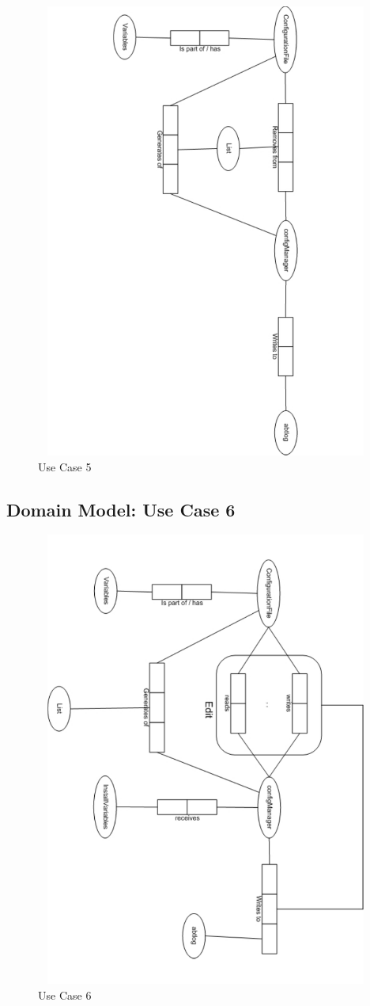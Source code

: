 \begin{figure}[htbp]
  \centering
  \includegraphics[angle=90,width=15cm,height=15cm]{"domainmodel-usecase5"}
  \caption{Use Case 5}
  \label{fig:usecase5}
\end{figure}

\newpage
\subsection{Domain Model: Use Case 6}

\begin{figure}[htbp]
  \centering
  \includegraphics[angle=90,width=15cm,height=15cm]{"domainmodel-usecase6"}
  \caption{Use Case 6}
  \label{fig:usecase6}
\end{figure}


